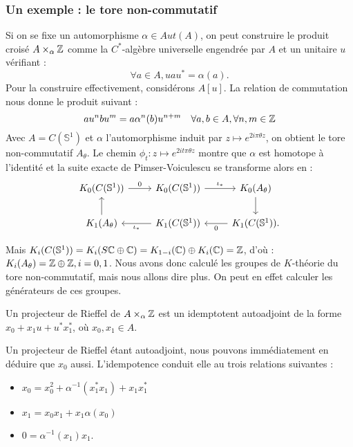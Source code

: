 \subsubsection{Un exemple : le tore non-commutatif}
 
Si on se fixe un automorphisme $\alpha \in Aut(A)$, on peut construire le produit croisé $A\times_\alpha \mathbb Z$ comme la $C^*$-algèbre universelle engendrée par $A$ et un unitaire $u$ vérifiant :
\[\forall a \in A, uau^*=\alpha(a).\]
Pour la construire effectivement, considérons $A[u]$. La relation de commutation nous donne le produit suivant :
\[au^n bu^m = a \alpha^n(b)u^{n+m}\quad \forall a,b \in A, \forall n,m \in \mathbb Z\]
Avec $A=C(\mathbb S^1)$ et $\alpha$ l'automorphisme induit par $z\mapsto e^{2i\pi\theta z}$, on obtient le tore non-commutatif $A_\theta$. Le chemin $\phi_t: z\mapsto e^{2it\pi\theta z}$ montre que $\alpha$ est homotope à l'identité et la suite exacte de Pimser-Voiculescu se transforme alors en :
\[\begin{tikzcd}
 K_0(C(\mathbb S^1)) \arrow{r}{0} & K_0(C(\mathbb S^1))  \arrow{r}{\iota_*}  &    K_0(A_\theta)  \arrow{d}  \\
 K_1(A_\theta) \arrow{u} & K_1(C(\mathbb S^1))  \arrow{l}{\iota_*} &    K_1(C(\mathbb S^1)) \arrow{l}{0}.
\end{tikzcd}\]

Mais $K_i(C(\mathbb S^1))=K_i(S\mathbb C \oplus \mathbb C)=K_{1-i}(\mathbb C)\oplus K_i(\mathbb C)=\mathbb Z$, d'où : $K_i(A_\theta)=\mathbb Z \oplus\mathbb Z, i=0,1$. Nous avons donc calculé les groupes de $K$-théorie du tore non-commutatif, mais nous allons dire plus. On peut en effet calculer les générateurs de ces groupes. \\

\begin{definition}
Un projecteur de Rieffel de $A\times_\alpha \mathbb Z$ est un idemptotent autoadjoint de la forme $x_0+x_1 u +u^*x_1^*$, où $x_0,x_1 \in A$.\\
\end{definition}
Un projecteur de Rieffel étant autoadjoint, nous pouvons immédiatement en déduire que $x_0$ aussi. L'idempotence conduit elle au trois relations suivantes : %
\begin{itemize}
\item $x_0=x_0^2+\alpha^{-1}(x_1^* x_1)+x_1 x_1^*$
\item $x_1= x_0 x_1 +x_1 \alpha(x_0)$
\item $0=\alpha^{-1}(x_1)x_1$.
\end{itemize}

